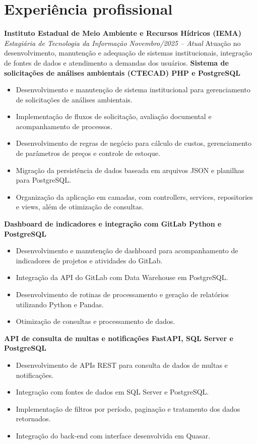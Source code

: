 \documentclass[10pt,a4paper]{article}
\begin{document}
\section*{Experiência profissional}
\textbf{Instituto Estadual de Meio Ambiente e Recursos Hídricos (IEMA)}\\[-2pt]
\textit{Estagiária de Tecnologia da Informação \textbar{} Novembro/2025 -- Atual}
Atuação no desenvolvimento, manutenção e adequação de sistemas institucionais, integração de fontes de dados e atendimento a demandas dos usuários.
\vspace{2pt}
\textbf{Sistema de solicitações de análises ambientais (CTECAD) \textbar{} PHP e PostgreSQL}
\begin{itemize}
\item Desenvolvimento e manutenção de sistema institucional para gerenciamento de solicitações de análises ambientais.
\item Implementação de fluxos de solicitação, avaliação documental e acompanhamento de processos.
\item Desenvolvimento de regras de negócio para cálculo de custos, gerenciamento de parâmetros de preços e controle de estoque.
\item Migração da persistência de dados baseada em arquivos JSON e planilhas para PostgreSQL.
\item Organização da aplicação em camadas, com controllers, services, repositories e views, além de otimização de consultas.
\end{itemize}
\vspace{1pt}
\textbf{Dashboard de indicadores e integração com GitLab \textbar{} Python e PostgreSQL}
\begin{itemize}
\item Desenvolvimento e manutenção de dashboard para acompanhamento de indicadores de projetos e atividades do GitLab.
\item Integração da API do GitLab com Data Warehouse em PostgreSQL.
\item Desenvolvimento de rotinas de processamento e geração de relatórios utilizando Python e Pandas.
\item Otimização de consultas e processamento de dados.
\end{itemize}
\vspace{1pt}
\textbf{API de consulta de multas e notificações \textbar{} FastAPI, SQL Server e PostgreSQL}
\begin{itemize}
\item Desenvolvimento de APIs REST para consulta de dados de multas e notificações.
\item Integração com fontes de dados em SQL Server e PostgreSQL.
\item Implementação de filtros por período, paginação e tratamento dos dados retornados.
\item Integração do back-end com interface desenvolvida em Quasar.
\end{itemize}
\end{document}
